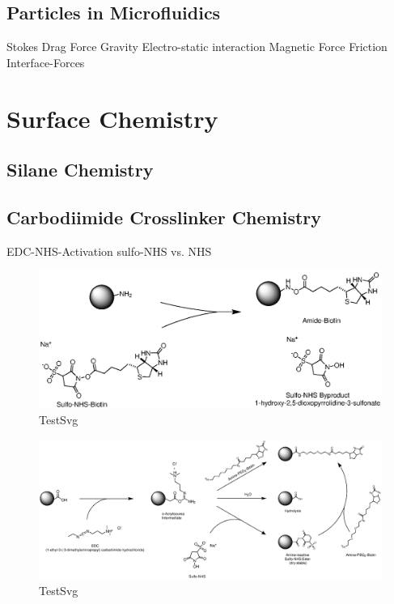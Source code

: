 \subsection{Particles in Microfluidics}
Stokes Drag Force
Gravity
Electro-static interaction
Magnetic Force
Friction
Interface-Forces
\subsection{}

\section{Surface Chemistry}
\subsection{Silane Chemistry}
\subsection{Carbodiimide Crosslinker Chemistry}
EDC-NHS-Activation
sulfo-NHS vs. NHS
\begin{figure}[hbtp]
\centering
\includegraphics[width=\textwidth]{./Ressources/Chemistry/Sulfo-NHS.eps}
\caption{TestSvg}
\label{fig:Chem:NH2-NHS}
\end{figure}

\begin{figure}[hbtp]
\centering
\includegraphics[width=\textwidth]{./Ressources/Chemistry/EDC-NHS.eps}
\caption{TestSvg}
\label{fig:Chem:COOH-EDC-NHS}
\end{figure}
